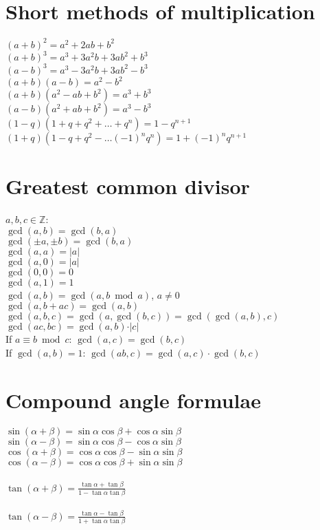 \documentclass[a4paper, 10pt]{scrartcl}
\begin{document}
\section{Short methods of multiplication}
$(a + b)^{2} = a^{2} + 2ab + b^{2}$\\
$(a + b)^{3} = a^{3} + 3a^{2}b + 3ab^{2} + b^{3}$\\
$(a - b)^{3} = a^{3} - 3a^{2}b + 3ab^{2} - b^{3}$\\
$(a + b)(a - b) = a^{2} - b^{2}$\\
$(a + b)(a^{2} - ab + b^{2}) = a^{3} + b^{3}$\\
$(a - b)(a^{2} + ab + b^{2}) = a^{3} - b^{3}$\\
$(1 - q)(1 + q + q^{2} + \dots + q^{n}) = 1 - q^{n+1}$\\
$(1 + q)(1 - q + q^{2} - \dots (-1)^{n}q^{n}) = 1 + (-1)^{n}q^{n+1}$\\

\section{Greatest common divisor}
$a, b, c\in \mathbb{Z}$:\\
$\gcd(a, b) = \gcd(b, a)$\\
$\gcd(\pm a, \pm b) = \gcd(b, a)$\\
$\gcd(a, a) = \vert a\vert$\\
$\gcd(a, 0) = \vert a\vert$\\
$\gcd(0, 0) = 0$\\
$\gcd(a, 1) = 1$\\
$\gcd(a, b) = \gcd(a, b\bmod a)$, $a\neq 0$\\
$\gcd(a, b + ac) = \gcd(a, b)$\\
$\gcd(a, b, c) = \gcd(a, \gcd(b, c)) = \gcd(\gcd(a, b), c)$\\
$\gcd(ac, bc) = \gcd(a, b)\cdot\vert c\vert$\\
If $a\equiv b\bmod c$: $\gcd(a, c) = \gcd(b, c)$\\
If $\gcd(a, b) = 1$: $\gcd(ab, c) = \gcd(a, c)\cdot\gcd(b, c)$\\

\section{Compound angle formulae}
$\sin{(\alpha + \beta)} = \sin{\alpha}\cos{\beta} + \cos{\alpha}\sin{\beta}$\\
$\sin{(\alpha - \beta)} = \sin{\alpha}\cos{\beta} - \cos{\alpha}\sin{\beta}$\\
$\cos{(\alpha + \beta)} = \cos{\alpha}\cos{\beta} - \sin{\alpha}\sin{\beta}$\\
$\cos{(\alpha - \beta)} = \cos{\alpha}\cos{\beta} + \sin{\alpha}\sin{\beta}$\\\\
$\tan{(\alpha + \beta)} = \frac{\tan{\alpha} + \tan{\beta}}{1 - \tan{\alpha}\tan{\beta}}$\\\\
$\tan{(\alpha - \beta)} = \frac{\tan{\alpha} - \tan{\beta}}{1 + \tan{\alpha}\tan{\beta}}$\\
\end{document}
